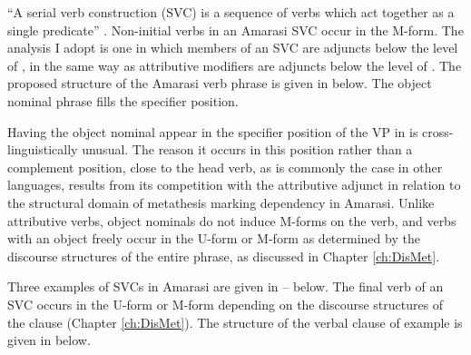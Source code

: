 ``A serial verb construction (SVC) is a sequence of verbs which
act together as a single predicate'' \citep[1]{ai06}.
Non-initial verbs in an Amarasi SVC occur in the M-form.
The analysis I adopt is one in which members of an SVC
are adjuncts below the level of , in the same way
as attributive modifiers are adjuncts below the level of .
The proposed structure of the Amarasi verb phrase is given in  below.
The object nominal phrase fills the specifier position.

\begin{exe}
		\label{tr:VerPhr 2}
\end{exe}

Having the object nominal appear in the specifier position of the VP
in  is cross-linguistically unusual.
The reason it occurs in this position rather than a complement position,
close to the head verb, as is commonly the case in other languages,
results from its competition with the attributive adjunct in relation
to the structural domain of metathesis marking dependency in Amarasi.
Unlike attributive verbs, object nominals do not induce M-forms on the verb,
and verbs with an object freely occur in the U-form or M-form as determined by the discourse
structures of the entire phrase, as discussed in Chapter \ref{ch:DisMet}.

Three examples of SVCs in Amarasi are given in -- below.
The final verb of an SVC occurs in the U-form or M-form depending on the discourse
structures of the clause (Chapter \ref{ch:DisMet}).
The structure of the verbal clause of example 
is given in  below.


